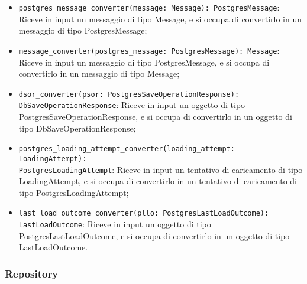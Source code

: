 \begin{itemize}
    \item \texttt{postgres\_message\_converter(message: Message): PostgresMessage}: Riceve in input un messaggio di tipo Message, e si occupa di convertirlo in un messaggio di tipo PostgresMessage;
    \item \texttt{message\_converter(postgres\_message: PostgresMessage): Message}: Riceve in input un messaggio di tipo PostgresMessage, e si occupa di convertirlo in un messaggio di tipo Message;
    \item \texttt{dsor\_converter(psor: PostgresSaveOperationResponse): DbSaveOperationResponse}: Riceve in input un oggetto di tipo PostgresSaveOperationResponse, e si occupa di convertirlo in un oggetto di tipo DbSaveOperationResponse;
    \item \texttt{postgres\_loading\_attempt\_converter(loading\_attempt: LoadingAttempt):\\ PostgresLoadingAttempt}: Riceve in input un tentativo di caricamento di tipo LoadingAttempt, e si occupa di convertirlo in un tentativo di caricamento di tipo PostgresLoadingAttempt;
    \item \texttt{last\_load\_outcome\_converter(pllo: PostgresLastLoadOutcome): LastLoadOutcome}: Riceve in input un oggetto di tipo PostgresLastLoadOutcome, e si occupa di convertirlo in un oggetto di tipo LastLoadOutcome.
\end{itemize}

\newpage



\subsubsection{Repository}
\label{sec:repository}

